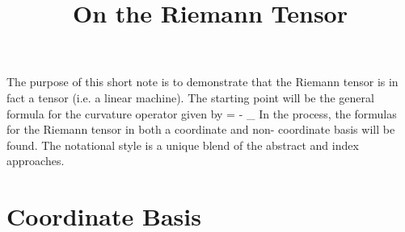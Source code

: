 \documentclass[12pt]{article}
\begin{document}
\title{On the Riemann Tensor}
\maketitle


The purpose of this short note is to demonstrate that the Riemann tensor is
in fact a tensor (i.e. a linear machine).  The starting point will be
the general formula for the curvature operator given by
\bes
  \mR{} = 
      - \nabla_{} \eqp
\ees
In the process, the formulas for the Riemann tensor in both a coordinate and non-
coordinate basis will be found.  The notational style is a unique blend of
the abstract and index approaches.

\section{Coordinate Basis}
\end{document}
